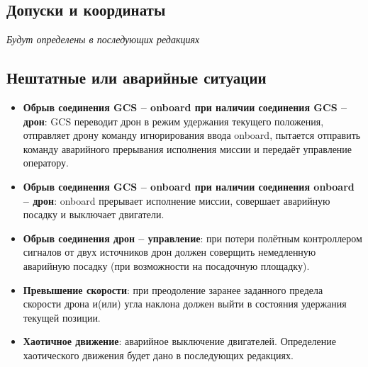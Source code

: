 \documentclass[a4paper, 14pt]{extarticle}
\begin{document}
\subsection{Допуски и координаты}
\textit{Будут определены в последующих редакциях}

\subsection{Нештатные или аварийные ситуации}
\begin{itemize}
  \item \textbf{Обрыв соединения GCS -- onboard при наличии соединения GCS -- дрон}: GCS переводит дрон в режим удержания текущего положения, отправляет дрону команду игнорирования ввода onboard, пытается отправить команду аварийного прерывания исполнения миссии и передаёт управление оператору.
  \item \textbf{Обрыв соединения GCS -- onboard при наличии соединения onboard -- дрон}: onboard прерывает исполнение миссии, совершает аварийную посадку и выключает двигатели.
  \item \textbf{Обрыв соединения дрон -- управление}: при потери полётным контроллером сигналов от двух источников дрон должен соверщить немедленную аварийную посадку (при возможности на посадочную площадку).
  \item \textbf{Превышение скорости}: при преодоление заранее заданного предела скорости дрона и(или) угла наклона должен выйти в состояния удержания текущей позиции.
  \item \textbf{Хаотичное движение}: аварийное выключение двигателей. Определение хаотического движения будет дано в последующих редакциях.
\end{itemize}
\end{document}

